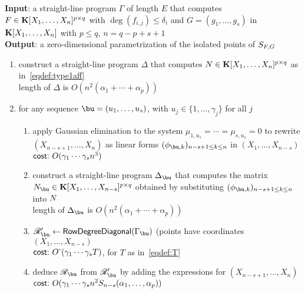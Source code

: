 \documentclass[12pt]{article}
\begin{document}

















\begin{algorithm}[!h]
\caption{$\mathsf{RowDegree}(\Gamma)$}
{\bf Input}:  a straight-line program $\Gamma$ of length $E$ that computes
 $F \in \mathbf{K}[X_1, \ldots, X_n]^{p \times q}$ with $\deg(f_{i,j}) \leq \delta_i$
and $G = (g_1, \ldots, g_s)$ in $\mathbf{K}[X_1, \ldots, X_n]$ with $p \leq q$, $n = q-p+s+1$\\
{\bf Output}: a zero-dimensional parametrization of the isolated points of $S_{{F},G}$
\begin{enumerate}
\item construct a straight-line program $\Delta$ that computes ${N} \in \mathbf{K}[X_1,\dots,X_n]^{p \times q}$ as in~\eqref{eqdef:type1aff}\\
length of $\Delta$ is $O(n^2(\alpha_1+\cdots+\alpha_p))$
\item for any sequence $\bu=(u_1,\dots,u_s)$, with $u_j \in \{1,\dots,\gamma_j\}$ for all $j$
\begin{enumerate}
\item apply Gaussian elimination to the system $\mu_{1,u_1}=\cdots=\mu_{s,u_s}=0$
  to rewrite $(X_{n-s+1}, \ldots, X_n)$ as linear forms $(\phi_{\bu,k})_{n-s+1 \le k \le n}$ in $(X_1,\dots,X_{n-s})$\\
  $\text{\sf{cost:~}} O(\gamma_1 \cdots \gamma_s n^3)$

\item construct a straight-line program $\Delta_{\bu}$ that computes the matrix 
  $\mN_\bu  \in \KK[X_1, \dots, X_{n-s}]^{p \times q}$ obtained
  by substituting $(\phi_{\bu,k})_{n-s+1 \le k \le n}$ into ${N}$ \\
  length of $\Delta_{\bu}$ is $O(n^2(\alpha_1+\cdots+\alpha_p))$

\item $\scrR'_\bu \gets \mathsf{RowDegreeDiagonal}(\Gamma_\bu)$ (points have coordinates $(X_1,\dots,X_{n-s})$\\
  $\text{\sf{cost:~}} {O}{\,\tilde{ }\,}(\gamma_1 \cdots \gamma_s T)$, for $T$ as in~\eqref{eqdef:T}

\item deduce $\scrR_\bu$ from $\scrR'_\bu$ by adding the expressions for $(X_{n-s+1},\dots,X_n)$ 
  $\text{\sf{cost:~}} O(\gamma_1 \cdots \gamma_s n^2 S_{n-s}(\alpha_1,\dots,\alpha_p))$



\end{enumerate}
\end{enumerate}
\end{algorithm}
\end{document}
